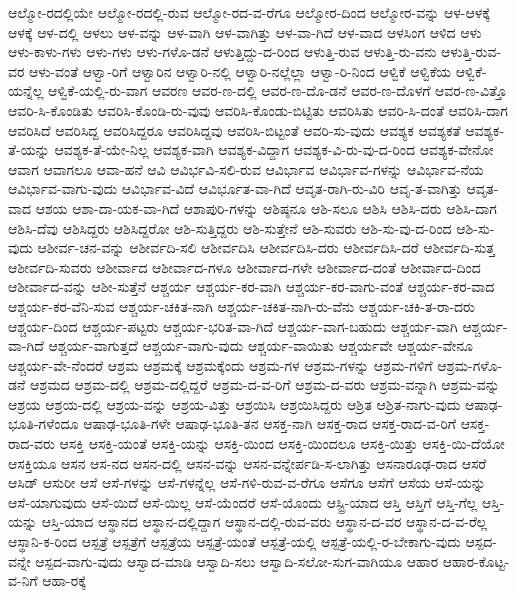 {ಆಲ್ಮೋ-ರದಲ್ಲಿಯೇ
ಆಲ್ಮೋ-ರದಲ್ಲಿ-ರುವ
ಆಲ್ಮೋ-ರದ-ವ-ರೆಗೂ
ಆಲ್ಮೋರ-ದಿಂದ
ಆಲ್ಮೋರ-ವನ್ನು
ಆಳ-ಆಳಕ್ಕೆ
ಆಳಕ್ಕೆ
ಆಳ-ದಲ್ಲಿ
ಆಳಲು
ಆಳ-ವನ್ನು
ಆಳ-ವಾಗಿ
ಆಳ-ವಾಗಿತ್ತು
ಆಳ-ವಾ-ಗಿದೆ
ಆಳ-ವಾದ
ಆಳಸಿಂಗ
ಆಳಿದ
ಆಳು
ಆಳು-ಕಾಳು-ಗಳು
ಆಳು-ಗಳು
ಆಳು-ಗಳೊ-ಡನೆ
ಆಳುತ್ತಿದ್ದು-ದ-ರಿಂದ
ಆಳುತ್ತಿ-ರುವ
ಆಳುತ್ತಿ-ರು-ವನು
ಆಳುತ್ತಿ-ರುವ-ವರ
ಆಳು-ವಂತೆ
ಆಳ್ವಾ-ರಿಗೆ
ಆಳ್ವಾರಿನ
ಆಳ್ವಾರಿ-ನಲ್ಲಿ
ಆಳ್ವಾರಿ-ನಲ್ಲೆಲ್ಲಾ
ಆಳ್ವಾ-ರಿ-ನಿಂದ
ಆಳ್ವಿಕೆ
ಆಳ್ವಿಕೆಯ
ಆಳ್ವಿಕೆ-ಯನ್ನೆಲ್ಲ
ಆಳ್ವಿಕೆ-ಯಲ್ಲಿ-ರು-ವಾಗ
ಆವರಣ
ಆವರ-ಣ-ದಲ್ಲಿ
ಆವರ-ಣ-ದೊ-ಡನೆ
ಆವರ-ಣ-ದೊಳಗೆ
ಆವರ-ಣ-ವಿತ್ತೊ
ಆವರಿ-ಸಿ-ಕೊಂಡಿತು
ಆವರಿಸಿ-ಕೊಂಡಿ-ರು-ವುವು
ಆವರಿಸಿ-ಕೊಂಡು-ಬಿಟ್ಟಿತು
ಆವರಿಸಿತು
ಆವರಿ-ಸಿ-ದಂತೆ
ಆವರಿಸಿ-ದಾಗ
ಆವರಿಸಿದೆ
ಆವರಿಸಿದ್ದ
ಆವರಿಸಿದ್ದರೂ
ಆವರಿಸಿದ್ದವು
ಆವರಿಸಿ-ಬಿಟ್ಟಂತೆ
ಆವರಿ-ಸು-ವುದು
ಆವಶ್ಯಕ
ಆವಶ್ಯಕತೆ
ಆವಶ್ಯಕ-ತೆ-ಯನ್ನು
ಆವಶ್ಯಕ-ತೆ-ಯೇ-ನಿಲ್ಲ
ಆವಶ್ಯಕ-ವಾಗಿ
ಆವಶ್ಯಕ-ವಿದ್ದಾಗ
ಆವಶ್ಯಕ-ವಿ-ರು-ವು-ದ-ರಿಂದ
ಆವಶ್ಯಕ-ವೇನೋ
ಆವಾಗ
ಆವಾಗಲೂ
ಆವಾ-ಹನೆ
ಆವಿ
ಆವಿರ್ಭವಿ-ಸಲಿ-ರುವ
ಆವಿರ್ಭಾವ
ಆವಿರ್ಭಾವ-ಗಳನ್ನು
ಆವಿರ್ಭಾವ-ನೆಯ
ಆವಿರ್ಭಾವ-ವಾಗು-ವುದು
ಆವಿರ್ಭಾವ-ವಿದೆ
ಆವಿರ್ಭೂತ-ವಾ-ಗಿದೆ
ಆವೃತ-ರಾಗಿ-ರು-ವಿರಿ
ಆವೃ-ತ-ವಾಗಿತ್ತು
ಆವೃತ-ವಾದ
ಆಶಯ
ಆಶಾ-ದಾ-ಯಕ-ವಾ-ಗಿದೆ
ಆಶಾಪುರಿ-ಗಳನ್ನು
ಆಶಿಷ್ಠನೂ
ಆಶಿ-ಸಲೂ
ಆಶಿಸಿ
ಆಶಿಸಿ-ದರು
ಆಶಿಸಿ-ದಾಗ
ಆಶಿಸಿ-ದೆವು
ಆಶಿಸಿದ್ದರು
ಆಶಿಸಿದ್ದರೋ
ಆಶಿ-ಸುತ್ತಿದ್ದರು
ಆಶಿ-ಸುತ್ತೇನೆ
ಆಶಿ-ಸುವರು
ಆಶಿ-ಸು-ವು-ದ-ರಿಂದ
ಆಶಿ-ಸು-ವುದು
ಆಶೀರ್ವ-ಚನ-ವನ್ನು
ಆಶೀರ್ವದಿ-ಸಲಿ
ಆಶೀರ್ವದಿಸಿ
ಆಶೀರ್ವದಿಸಿ-ದರು
ಆಶೀರ್ವದಿಸಿ-ದರೆ
ಆಶೀರ್ವದಿ-ಸುತ್ತ
ಆಶೀರ್ವದಿ-ಸುವರು
ಆಶೀರ್ವಾದ
ಆಶೀರ್ವಾದ-ಗಳೂ
ಆಶೀರ್ವಾದ-ಗಳೇ
ಆಶೀರ್ವಾದ-ದಂತೆ
ಆಶೀರ್ವಾದ-ದಿಂದ
ಆಶೀರ್ವಾದ-ವನ್ನು
ಆಶೀ-ಸುತ್ತೆನೆ
ಆಶ್ಚರ್ಯ
ಆಶ್ಚರ್ಯ-ಕರ-ವಾಗಿ
ಆಶ್ಚರ್ಯ-ಕರ-ವಾಗು-ವಂತೆ
ಆಶ್ಚರ್ಯ-ಕರ-ವಾದ
ಆಶ್ಚರ್ಯ-ಕರ-ವೆನಿ-ಸುವ
ಆಶ್ಚರ್ಯ-ಚಕಿತ-ನಾಗಿ
ಆಶ್ಚರ್ಯ-ಚಕಿತ-ನಾಗಿ-ರು-ವೆನು
ಆಶ್ಚರ್ಯ-ಚಕಿ-ತ-ರಾ-ದರು
ಆಶ್ಚರ್ಯ-ದಿಂದ
ಆಶ್ಚರ್ಯ-ಪಟ್ಟರು
ಆಶ್ಚರ್ಯ-ಭರಿತ-ವಾ-ಗಿದೆ
ಆಶ್ಚರ್ಯ-ವಾಗ-ಬಹುದು
ಆಶ್ಚರ್ಯ-ವಾಗಿ
ಆಶ್ಚರ್ಯ-ವಾ-ಗಿದೆ
ಆಶ್ಚರ್ಯ-ವಾಗುತ್ತದೆ
ಆಶ್ಚರ್ಯ-ವಾಗು-ವುದು
ಆಶ್ಚರ್ಯ-ವಾಯಿತು
ಆಶ್ಚರ್ಯವೇ
ಆಶ್ಚರ್ಯ-ವೇನೂ
ಆಶ್ಚರ್ಯ-ವೇ-ನೆಂದರೆ
ಆಶ್ರಮ
ಆಶ್ರಮಕ್ಕೆ
ಆಶ್ರಮಕ್ಕೆಂದು
ಆಶ್ರಮ-ಗಳ
ಆಶ್ರಮ-ಗಳನ್ನು
ಆಶ್ರಮ-ಗಳಿಗೆ
ಆಶ್ರಮ-ಗಳೊ-ಡನೆ
ಆಶ್ರಮದ
ಆಶ್ರಮ-ದಲ್ಲಿ
ಆಶ್ರಮ-ದಲ್ಲಿದ್ದರೆ
ಆಶ್ರಮ-ದ-ವ-ರಿಗೆ
ಆಶ್ರಮ-ದ-ವರು
ಆಶ್ರಮ-ವನ್ನಾಗಿ
ಆಶ್ರಮ-ವನ್ನು
ಆಶ್ರಯ
ಆಶ್ರಯ-ದಲ್ಲಿ
ಆಶ್ರಯ-ವನ್ನು
ಆಶ್ರಯ-ವಿತ್ತು
ಆಶ್ರಯಿಸಿ
ಆಶ್ರಯಿಸಿದ್ದರು
ಆಶ್ರಿತ
ಆಶ್ರಿತ-ನಾಗು-ವುದು
ಆಷಾಢ-ಭೂತಿ-ಗಳೆಂದೂ
ಆಷಾಢ-ಭೂತಿ-ಗಳೇ
ಆಷಾಢ-ಭೂತಿ-ತನ
ಆಸಕ್ತ-ನಾಗಿ
ಆಸಕ್ತ-ರಾದ
ಆಸಕ್ತ-ರಾದ-ವ-ರಿಗೆ
ಆಸಕ್ತ-ರಾದ-ವರು
ಆಸಕ್ತಿ
ಆಸಕ್ತಿ-ಯಂತೆ
ಆಸಕ್ತಿ-ಯನ್ನು
ಆಸಕ್ತಿ-ಯಿಂದ
ಆಸಕ್ತಿ-ಯಿಂದಲೂ
ಆಸಕ್ತಿ-ಯಿತ್ತು
ಆಸಕ್ತಿ-ಯಿ-ದೆಯೋ
ಆಸಕ್ತಿಯೂ
ಆಸನ
ಆಸ-ನದ
ಆಸನ-ದಲ್ಲಿ
ಆಸನ-ವನ್ನು
ಆಸನ-ವನ್ನೇರ್ಪಡಿ-ಸ-ಲಾಗಿತ್ತು
ಆಸನಾರೂಢ-ರಾದ
ಆಸರೆ
ಆಸಿಡ್
ಆಸುರೀ
ಆಸೆ
ಆಸೆ-ಗಳನ್ನು
ಆಸೆ-ಗಳನ್ನೆಲ್ಲ
ಆಸೆ-ಗಳಿ-ರುವ-ವ-ರೆಗೂ
ಆಸೆಗೂ
ಆಸೆಗೆ
ಆಸೆಯ
ಆಸೆ-ಯನ್ನು
ಆಸೆ-ಯಾಗುವುದು
ಆಸೆ-ಯಿದೆ
ಆಸೆ-ಯಿಲ್ಲ
ಆಸೆ-ಯೆಂದರೆ
ಆಸೆ-ಯೊಂದು
ಆಸ್ಟ್ರಿ-ಯಾದ
ಆಸ್ತಿ
ಆಸ್ತಿಗೆ
ಆಸ್ತಿ-ಗೆಲ್ಲ
ಆಸ್ತಿ-ಯನ್ನು
ಆಸ್ತಿ-ಯಾದ
ಆಸ್ಥಾನದ
ಆಸ್ಥಾನ-ದಲ್ಲಿದ್ದಾಗ
ಆಸ್ಥಾನ-ದಲ್ಲಿ-ರುವ-ವರು
ಆಸ್ಥಾನ-ದ-ವರ
ಆಸ್ಥಾನ-ದ-ವ-ರೆಲ್ಲ
ಆಸ್ಥಾನಿ-ಕ-ರಿಂದ
ಆಸ್ಪತ್ರೆ
ಆಸ್ಪತ್ರೆಗೆ
ಆಸ್ಪತ್ರೆಯ
ಆಸ್ಪತ್ರೆ-ಯಂತೆ
ಆಸ್ಪತ್ರೆ-ಯಲ್ಲಿ
ಆಸ್ಪತ್ರೆ-ಯಲ್ಲಿ-ರ-ಬೇಕಾಗು-ವುದು
ಆಸ್ಪದ-ವನ್ನೇ
ಆಸ್ಪದ-ವಾಗು-ವುದು
ಆಸ್ವಾದ-ಮಾಡಿ
ಆಸ್ವಾದಿ-ಸಲು
ಆಸ್ವಾದಿ-ಸಲೋ-ಸುಗ-ವಾಗಿಯೂ
ಆಹಾರ
ಆಹಾರ-ಕೊಟ್ಟ-ವ-ನಿಗೆ
ಆಹಾ-ರಕ್ಕೆ
}
